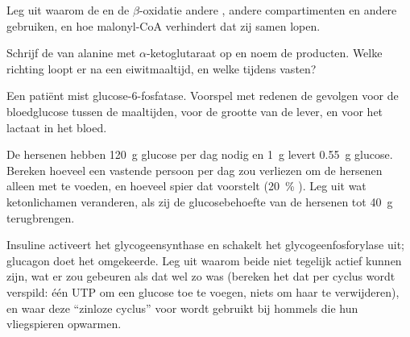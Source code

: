 \begin{exercise}[$\star\star$]\label{exo:b1:biosyntheses-integration:7}
Leg uit waarom de  en de $\beta$-oxidatie andere , andere
compartimenten en andere  gebruiken, en hoe malonyl-CoA verhindert dat
zij samen lopen.
\end{exercise}

\begin{exercise}[$\star\star$]\label{exo:b1:biosyntheses-integration:8}
Schrijf de  van alanine met $\alpha$-ketoglutaraat op en noem de
producten. Welke richting loopt er na een eiwitmaaltijd, en welke tijdens vasten?
\end{exercise}

\begin{exercise}[$\star\star$]\label{exo:b1:biosyntheses-integration:9}
Een patiënt mist glucose-6-fosfatase. Voorspel met redenen de gevolgen voor de
bloedglucose tussen de maaltijden, voor de grootte van de lever, en voor het
lactaat in het bloed.
\end{exercise}

\begin{exercise}[$\star\star\star$]\label{exo:b1:biosyntheses-integration:10}
De hersenen hebben \qty{120}{g} glucose per dag nodig en \qty{1}{g}  levert
\qty{0.55}{g} glucose. Bereken hoeveel  een vastende persoon per dag zou
verliezen om de hersenen alleen met  te voeden, en hoeveel spier dat
voorstelt (\qty{20}{\%} ). Leg uit wat ketonlichamen veranderen, als zij de
glucosebehoefte van de hersenen tot \qty{40}{g} terugbrengen.
\end{exercise}

\begin{exercise}[$\star\star\star$]\label{exo:b1:biosyntheses-integration:11}
Insuline activeert het glycogeensynthase en schakelt het glycogeenfosforylase uit;
glucagon doet het omgekeerde. Leg uit waarom beide niet tegelijk actief kunnen
zijn, wat er zou gebeuren als dat wel zo was (bereken het  dat per cyclus wordt
verspild: één UTP om een glucose toe te voegen, niets om haar te verwijderen), en
waar deze ``zinloze cyclus'' voor wordt gebruikt bij hommels die hun vliegspieren
opwarmen.
\end{exercise}

